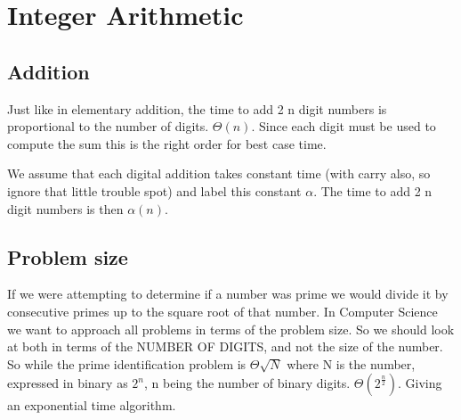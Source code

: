 \documentclass[english, 10pt]{article}
\begin{document}

\section{Integer Arithmetic}
\subsection{Addition}
Just like in elementary addition, the time to add 2 n digit numbers is proportional to the number of digits. $\Theta(n)$.
Since each digit must be used to compute the sum this is the right order for best case time.

\begin{center}
\qquad
\end{center}

We assume that each digital addition takes constant time (with carry also, so ignore that little trouble spot) and label this constant $\alpha$. The time to add 2 n digit numbers is then $\alpha(n)$.

\subsection{Problem size}

If we were attempting to determine if a number was prime we would divide it by consecutive primes up to the square root of that number.
In Computer Science we want to approach all problems in terms of the problem size. So we should look at both in terms of the NUMBER OF DIGITS,
and not the size of the number. So while the prime identification problem is $\Theta{\sqrt{N}}$ where N is the number,
expressed in binary as $2^n$, n being the number of binary digits. $\Theta(2^{\frac{n}{2}})$. Giving an exponential time algorithm.
\end{document}
